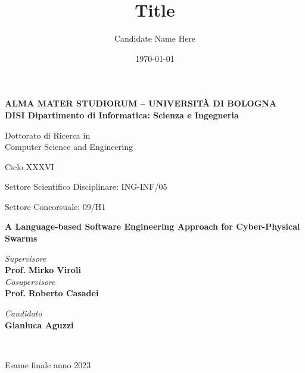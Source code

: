 \title{Title}
\author{Candidate Name Here}
\date{\today}

\begin{titlepage}
	\begin{center}
		
		\large
		\textbf{ALMA MATER STUDIORUM -- UNIVERSITÀ DI BOLOGNA \\ DISI Dipartimento di Informatica: Scienza e Ingegneria}
		\\
		\noindent\hrulefill
		\vspace{0.4cm}
		
		\Large
		Dottorato di Ricerca in \\
		Computer Science and Engineering

		\vspace{0.4cm}

		Ciclo XXXVI

		\vspace{0.4cm}

		Settore Scientifico Disciplinare: ING-INF/05
		
		Settore Concorsuale: 09/H1
		
		\Huge
		\vspace{3cm}
		\textbf{
			A Language-based Software Engineering Approach for Cyber-Physical Swarms
		}
		
		\large
		
		\vspace{5.5cm}
		\begin{minipage}[t]{0.64\textwidth}
			\begin{flushleft}
				\textit{Supervisore} 
				\\ 
				\textbf{Prof.} \textbf{Mirko Viroli}
				\\
				\vspace{0.4cm}
				\textit{Cosupervisore} 
				\\
				\textbf{Prof.} \textbf{Roberto Casadei}
			\end{flushleft}
		\end{minipage}
		\begin{minipage}[t]{0.34\textwidth}
			\begin{flushright}
				\textit{Candidato} 
				\\ 
				\textbf{Gianluca Aguzzi}
			\end{flushright}
		\end{minipage}\\
		
		\vfill
		\noindent\hrulefill
		\vspace{0.3cm}
		\Large

		Esame finale anno 2023
	\end{center}
\end{titlepage}
\restoregeometry
